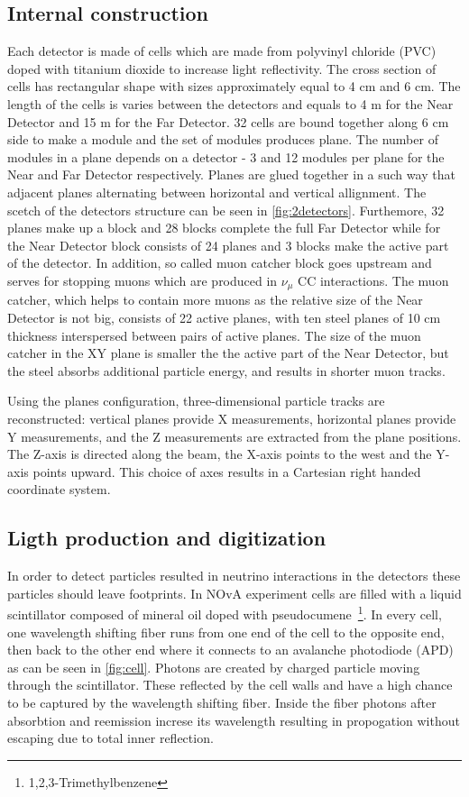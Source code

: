 \subsection{Internal construction}
Each detector is made of cells which are made from polyvinyl chloride (PVC) doped with titanium 
dioxide to increase light reflectivity. The cross section of cells has rectangular shape with sizes
approximately equal to 4 cm and 6 cm. The length of the cells is varies between the detectors and 
equals to 4 m for the Near Detector and 15 m for the Far Detector. 32 cells are bound together along
6 cm side to make a module and the set of modules produces plane. The number of modules in a plane
depends on a detector - 3 and 12 modules per plane for the Near and Far Detector respectively. Planes
are glued together in a such way that adjacent planes alternating between horizontal and vertical
allignment. The scetch of the detectors structure can be seen in \ref{fig:2detectors}. Furthemore, 32 planes 
make up a block and 28 blocks complete the full Far Detector while for the Near Detector block consists
of 24 planes and 3 blocks make the active part of the detector. In addition, so called muon catcher
block goes upstream and serves for stopping muons which are produced in $\nu_\mu$ CC interactions. 
The muon catcher, which helps to contain more muons as the relative size of the Near Detector is not big,
consists of 22 active planes, with ten steel planes of 10 cm thickness interspersed between pairs of active 
planes. The size of the muon catcher in the XY plane is smaller the the active part of the Near Detector, but the
steel absorbs additional particle energy, and results in shorter muon tracks.

Using the planes configuration, three-dimensional particle tracks are reconstructed: vertical planes
provide X measurements, horizontal planes provide Y measurements, and the Z measurements are extracted from
the plane positions. The Z-axis is directed along the beam, the X-axis points to the west and the Y-axis points
upward. This choice of axes results in a Cartesian right handed coordinate system.

\subsection{Ligth production and digitization}
In order to detect particles resulted in neutrino interactions in the detectors these particles 
should leave footprints. In NOvA experiment cells are filled with a liquid scintillator composed 
of mineral oil doped with pseudocumene~\footnote{1,2,3-Trimethylbenzene}. In every cell, one wavelength 
shifting fiber runs from one end of the cell to the opposite end, then back to the other end where 
it connects to an avalanche photodiode (APD) as can be seen in \ref{fig:cell}. Photons are created by charged 
particle moving through the scintillator. These reflected by the cell walls and have a high chance 
to be captured by the wavelength shifting fiber. Inside the fiber photons after absorbtion and
reemission increse its wavelength resulting in propogation without escaping due to total inner
reflection. 

